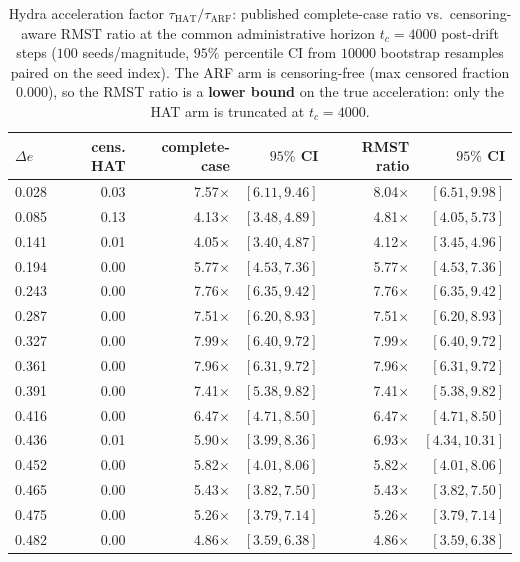\begin{table}[t]
  \centering
  \caption{Hydra acceleration factor $\tau_{\mathrm{HAT}}/\tau_{\mathrm{ARF}}$: published complete-case ratio vs.\ censoring-aware RMST ratio at the common administrative horizon $t_c = 4000$ post-drift steps ($100$ seeds/magnitude, $95\%$ percentile CI from $10000$ bootstrap resamples paired on the seed index). The ARF arm is censoring-free (max censored fraction $0.000$), so the RMST ratio is a \textbf{lower bound} on the true acceleration: only the HAT arm is truncated at $t_c=4000$.}
  \label{tab:hydra_survival}
  \begin{tabular}{@{}lrrrrr@{}}
    \toprule
    $\Delta e$ & cens. HAT & complete-case & $95\%$ CI & RMST ratio & $95\%$ CI \\
    \midrule
    0.028 & 0.03 & 7.57$\times$ & $[6.11, 9.46]$ & 8.04$\times$ & $[6.51, 9.98]$ \\
    0.085 & 0.13 & 4.13$\times$ & $[3.48, 4.89]$ & 4.81$\times$ & $[4.05, 5.73]$ \\
    0.141 & 0.01 & 4.05$\times$ & $[3.40, 4.87]$ & 4.12$\times$ & $[3.45, 4.96]$ \\
    0.194 & 0.00 & 5.77$\times$ & $[4.53, 7.36]$ & 5.77$\times$ & $[4.53, 7.36]$ \\
    0.243 & 0.00 & 7.76$\times$ & $[6.35, 9.42]$ & 7.76$\times$ & $[6.35, 9.42]$ \\
    0.287 & 0.00 & 7.51$\times$ & $[6.20, 8.93]$ & 7.51$\times$ & $[6.20, 8.93]$ \\
    0.327 & 0.00 & 7.99$\times$ & $[6.40, 9.72]$ & 7.99$\times$ & $[6.40, 9.72]$ \\
    0.361 & 0.00 & 7.96$\times$ & $[6.31, 9.72]$ & 7.96$\times$ & $[6.31, 9.72]$ \\
    0.391 & 0.00 & 7.41$\times$ & $[5.38, 9.82]$ & 7.41$\times$ & $[5.38, 9.82]$ \\
    0.416 & 0.00 & 6.47$\times$ & $[4.71, 8.50]$ & 6.47$\times$ & $[4.71, 8.50]$ \\
    0.436 & 0.01 & 5.90$\times$ & $[3.99, 8.36]$ & 6.93$\times$ & $[4.34, 10.31]$ \\
    0.452 & 0.00 & 5.82$\times$ & $[4.01, 8.06]$ & 5.82$\times$ & $[4.01, 8.06]$ \\
    0.465 & 0.00 & 5.43$\times$ & $[3.82, 7.50]$ & 5.43$\times$ & $[3.82, 7.50]$ \\
    0.475 & 0.00 & 5.26$\times$ & $[3.79, 7.14]$ & 5.26$\times$ & $[3.79, 7.14]$ \\
    0.482 & 0.00 & 4.86$\times$ & $[3.59, 6.38]$ & 4.86$\times$ & $[3.59, 6.38]$ \\

\end{tabular}
\end{table}
